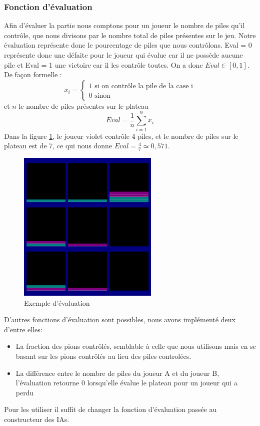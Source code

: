 \documentclass[article, backcover, french, nodocumentinfo]{upmethodology-document}
\begin{document}
			\subsubsection{Fonction d'évaluation}
					Afin d'évaluer la partie nous comptons pour un joueur  le nombre de piles qu’il contrôle, que nous divisons par le nombre total de piles présentes sur le jeu. Notre évaluation représente donc le pourcentage de piles que nous contrôlons. Eval = 0 représente donc une défaite pour le joueur qui évalue car il ne possède aucune pile et Eval = 1 une victoire car il les contrôle toutes. On a donc $Eval \in [0,1]$.\\
					De façon formelle :
					\[
					x_{i} = \left\{
					\begin{array}{ll}
						1 \mbox{ si  on contrôle la pile de la case i} \\
						0  \mbox{ sinon}
					\end{array}
					\right.
					\]
					et $n$ le nombre de piles présentes sur le plateau
					\[Eval = \frac{1}{n}  \sum_{i = 1}^{9} x_{i}\]
					Dans la figure \ref{fig:EvalExample}, le joueur violet contrôle 4 piles, et le nombre de piles sur le plateau est de 7, ce qui nous donne $Eval = \frac{4}{7} \simeq 0,571$.
					\begin{figure}[H]
						\centering
						\includegraphics[width=0.6\textwidth]{figures/Eval.png}
						\caption{Exemple d'évaluation}
						\label{fig:EvalExample}
					\end{figure}
					D'autres fonctions d'évaluation sont possibles, nous avons implémenté deux d'entre elles:
					\begin{itemize}
						\item La fraction des pions contrôlés, semblable à celle que nous utilisons mais en se basant sur les pions contrôlés au lieu des piles controlées.
						\item La différence entre le nombre de piles du joueur A et du joueur B, l’évaluation retourne 0 lorsqu'elle évalue le plateau pour un joueur qui a perdu
					\end{itemize}
					Pour les utiliser il suffit de changer la fonction d'évaluation passée au constructeur des IAs.
\end{document}
